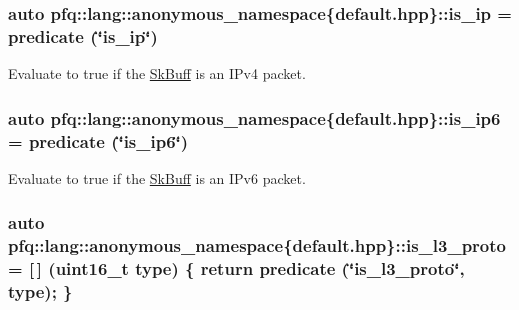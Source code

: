 \subsubsection[{\texorpdfstring{is\+\_\+ip}{is_ip}}]{\setlength{\rightskip}{0pt plus 5cm}auto pfq\+::lang\+::anonymous\+\_\+namespace\{default.\+hpp\}\+::is\+\_\+ip = {\bf predicate} (\char`\"{}is\+\_\+ip\char`\"{})}\hypertarget{namespacepfq_1_1lang_1_1anonymous__namespace_02default_8hpp_03_aa97a34e12e4c6bc2d85a5c169800cfa4}{}\label{namespacepfq_1_1lang_1_1anonymous__namespace_02default_8hpp_03_aa97a34e12e4c6bc2d85a5c169800cfa4}


Evaluate to {\ttfamily true} if the \hyperlink{structpfq_1_1lang_1_1SkBuff}{Sk\+Buff} is an I\+Pv4 packet. 

\subsubsection[{\texorpdfstring{is\+\_\+ip6}{is_ip6}}]{\setlength{\rightskip}{0pt plus 5cm}auto pfq\+::lang\+::anonymous\+\_\+namespace\{default.\+hpp\}\+::is\+\_\+ip6 = {\bf predicate} (\char`\"{}is\+\_\+ip6\char`\"{})}\hypertarget{namespacepfq_1_1lang_1_1anonymous__namespace_02default_8hpp_03_a5fa35e94e399b76838b7be894d85b83c}{}\label{namespacepfq_1_1lang_1_1anonymous__namespace_02default_8hpp_03_a5fa35e94e399b76838b7be894d85b83c}


Evaluate to {\ttfamily true} if the \hyperlink{structpfq_1_1lang_1_1SkBuff}{Sk\+Buff} is an I\+Pv6 packet. 

\subsubsection[{\texorpdfstring{is\+\_\+l3\+\_\+proto}{is_l3_proto}}]{\setlength{\rightskip}{0pt plus 5cm}auto pfq\+::lang\+::anonymous\+\_\+namespace\{default.\+hpp\}\+::is\+\_\+l3\+\_\+proto = \mbox{[}$\,$\mbox{]} (uint16\+\_\+t type) \{ return {\bf predicate} (\char`\"{}is\+\_\+l3\+\_\+proto\char`\"{}, type); \}}\hypertarget{namespacepfq_1_1lang_1_1anonymous__namespace_02default_8hpp_03_a814bb9c3c833dc2af342d695b1d503e8}{}\label{namespacepfq_1_1lang_1_1anonymous__namespace_02default_8hpp_03_a814bb9c3c833dc2af342d695b1d503e8}


